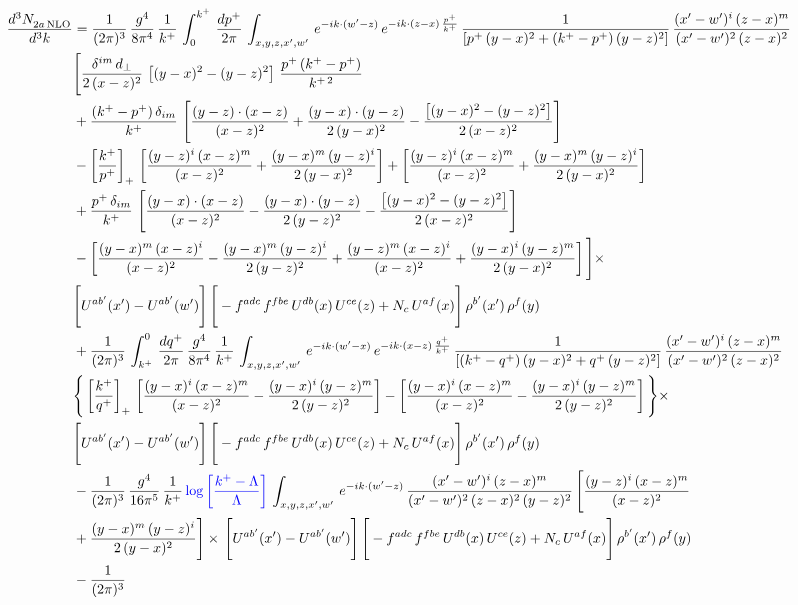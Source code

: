 \documentclass[10pt]{article}
\begin{document}
\begin{align}
    \frac{d^{3}N_{2a\,\rm NLO}^{\rm}}{d^{3}k}  & =  \frac{1}{(2\pi)^{3}}\, \frac{g^{4}}{8\pi^{4}}\,\frac{1}{k^{+}}\,\int_{0}^{k^{+}}\, \frac{dp^{+}}{2\pi}\,\int_{x,y,z,x',w'}\,e^{-ik\cdot(w'-z)}\,e^{-ik\cdot (z-x)\,\frac{p^{+}}{k^{+}}}\,\frac{1}{\left[p^{+}\,(y-x)^{2}+(k^{+}-p^{+})\,(y-z)^{2}\right]}\, \frac{(x'-w')^{i}\,(z-x)^{m}}{(x'-w')^{2}\,(z-x)^{2}} \notag \\ & \Bigg[\frac{\delta^{im}\,d_{\perp}}{2\,(x-z)^{2}}\,\left[(y-x)^{2}-(y-z)^{2}\right]\,\frac{p^{+}\,(k^{+}-p^{+})}{k^{+\,2}}\notag \\ & +\frac{(k^{+}-p^{+})\,\delta_{im}}{k^{+}}\,\left[\frac{(y-z)\cdot (x-z)}{(x-z)^{2}}+\frac{(y-x)\cdot (y-z)}{2\,(y-x)^{2}}-\frac{\left[(y-x)^{2}-(y-z)^{2}\right]}{2\,(x-z)^{2}}\right]\notag \\ & -\left[\frac{k^{+}}{p^{+}}\right]_{+}\,\left[\frac{(y-z)^{i}\,(x-z)^{m}}{(x-z)^{2}}+\frac{(y-x)^{m}\,(y-z)^{i}}{2\,(y-x)^{2}}\right]+ \left[\frac{(y-z)^{i}\,(x-z)^{m}}{(x-z)^{2}}+\frac{(y-x)^{m}\,(y-z)^{i}}{2\,(y-x)^{2}}\right]\notag \\ & +\frac{p^{+}\,\delta_{im}}{k^{+}}\,\left[\frac{(y-x)\cdot (x-z)}{(x-z)^{2}}-\frac{(y-x)\cdot (y-z)}{2\,(y-z)^{2}}-\frac{\left[(y-x)^{2}-(y-z)^{2}\right]}{2\,(x-z)^{2}}\right]\notag \\ &-\left[\frac{(y-x)^{m}\,(x-z)^{i}}{(x-z)^{2}}-\frac{(y-x)^{m}\,(y-z)^{i}}{2\,(y-z)^{2}}+\frac{(y-z)^{m}\,(x-z)^{i}}{(x-z)^{2}}+\frac{(y-x)^{i}\,(y-z)^{m}}{2\,(y-x)^{2}}\right]\Bigg]\times \notag \\ & \Bigg[U^{ab'}(x')-U^{ab'}(w')\Bigg]\,\Bigg[-f^{adc}\,f^{fbe}\,U^{db}(x)\,U^{ce}(z)+N_{c}\,U^{af}(x)\Bigg]\,\rho^{b'}(x')\,\rho^{f}(y)\notag \\ & + \frac{1}{(2\pi)^{3}}\,\int^{0}_{k^{+}}\, \frac{dq^{+}}{2\pi} \,\frac{g^{4}}{8\pi^{4}}\,\frac{1}{k^{+}}\, \int_{x,y,z,x',w'}\,e^{-ik\cdot(w'-x)}\,e^{-ik\cdot (x-z)\,\frac{q^{+}}{k^{+}}}\, \frac{1}{\left[(k^{+}-q^{+})\,(y-x)^{2}+q^{+}\,(y-z)^{2}\right]}\, \frac{(x'-w')^{i}\,(z-x)^{m}}{(x'-w')^{2}\,(z-x)^{2}} \notag \\ &\Bigg\{\left[\frac{k^{+}}{q^{+}}\right]_{+}\,\left[\frac{(y-x)^{i}\,(x-z)^{m}}{(x-z)^{2}}-\frac{(y-x)^{i}\,(y-z)^{m}}{2\,(y-z)^{2}}\right] -\left[\frac{(y-x)^{i}\,(x-z)^{m}}{(x-z)^{2}}-\frac{(y-x)^{i}\,(y-z)^{m}}{2\,(y-z)^{2}}\right]\Bigg\}\times\,\notag \\ & \Bigg[U^{ab'}(x')-U^{ab'}(w')\Bigg]\,\Bigg[-f^{adc}\,f^{fbe}\,U^{db}(x)\,U^{ce}(z)+N_{c}\,U^{af}(x)\Bigg]\,\rho^{b'}(x')\,\rho^{f}(y)\notag \\ & - \frac{1}{(2\pi)^{3}}\, \frac{g^{4}}{16\pi^{5}}\,\frac{1}{k^{+}}\,{\color{blue}\log{\left[\frac{k^{+}-\Lambda}{\Lambda}\right]}}\, \int_{x,y,z,x',w'}\, e^{-ik\cdot(w'-z)}\,\frac{(x'-w')^{i}\,(z-x)^{m}}{(x'-w')^{2}\,(z-x)^{2}\, (y-z)^{2}}\,\Bigg[\frac{(y-z)^{i}\,(x-z)^{m}}{(x-z)^{2}}\notag \\ & +\frac{(y-x)^{m}\,(y-z)^{i}}{2\,(y-x)^{2}}\Bigg]\times\, \Bigg[U^{ab'}(x')-U^{ab'}(w')\Bigg]\,\Bigg[-f^{adc}\,f^{fbe}\,U^{db}(x)\,U^{ce}(z)+N_{c}\,U^{af}(x)\Bigg]\,\rho^{b'}(x')\,\rho^{f}(y)\notag \\ & - \frac{1}{(2\pi)^{3}}\, 
\end{align}
\end{document}
